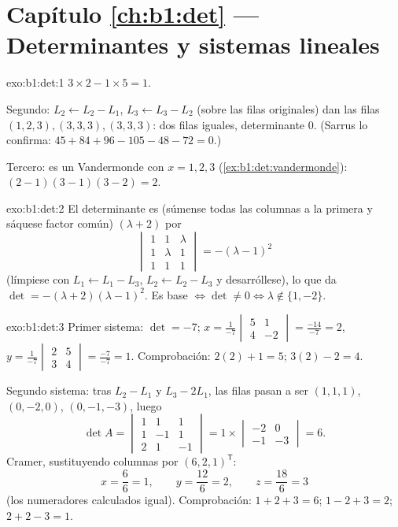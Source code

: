 \section*{Capítulo \ref{ch:b1:det} --- Determinantes y sistemas lineales}

\begin{solution}{exo:b1:det:1}
$3 \times 2 - 1 \times 5 = 1$.

Segundo: $L_2 \leftarrow L_2 - L_1$, $L_3 \leftarrow L_3 - L_2$
(sobre las filas originales) dan las filas $(1,2,3), (3,3,3),
(3,3,3)$: dos filas iguales, determinante $0$. (Sarrus lo confirma:
$45 + 84 + 96 - 105 - 48 - 72 = 0$.)

Tercero: es un Vandermonde con $x = 1, 2, 3$
(\cref{ex:b1:det:vandermonde}): $(2-1)(3-1)(3-2) = 2$.
\end{solution}

\begin{solution}{exo:b1:det:2}
El determinante es (súmense todas las columnas a la primera y
sáquese factor común) $(\lambda + 2)$ por
\[
\begin{vmatrix}
1 & 1 & \lambda\\ 1 & \lambda & 1\\ 1 & 1 & 1
\end{vmatrix}
= -(\lambda - 1)^2
\]
(límpiese con $L_1 \leftarrow L_1 - L_3$, $L_2 \leftarrow L_2 - L_3$
y desarróllese), lo que da $\det = -(\lambda+2)(\lambda-1)^2$. Es
base $\iff \det \neq 0 \iff \lambda \notin \{1, -2\}$.
\end{solution}

\begin{solution}{exo:b1:det:3}
Primer sistema: $\det = -7$;
$x = \frac{1}{-7}\begin{vmatrix} 5 & 1\\ 4 & -2\end{vmatrix}
= \frac{-14}{-7} = 2$,
$y = \frac{1}{-7}\begin{vmatrix} 2 & 5\\ 3 & 4\end{vmatrix}
= \frac{-7}{-7} = 1$. Comprobación: $2(2) + 1 = 5$; $3(2) - 2 = 4$.

Segundo sistema: tras $L_2 - L_1$ y $L_3 - 2L_1$, las filas pasan a
ser $(1,1,1)$, $(0,-2,0)$, $(0,-1,-3)$, luego
\[
\det A = \begin{vmatrix} 1&1&1\\ 1&-1&1\\ 2&1&-1\end{vmatrix}
= 1 \times \begin{vmatrix} -2 & 0\\ -1 & -3\end{vmatrix} = 6 .
\]
Cramer, sustituyendo columnas por $(6,2,1)^{\mathsf T}$:
\[
x = \frac{6}{6} = 1, \qquad
y = \frac{12}{6} = 2, \qquad
z = \frac{18}{6} = 3
\]
(los numeradores calculados igual). Comprobación: $1 + 2 + 3 = 6$;
$1 - 2 + 3 = 2$; $2 + 2 - 3 = 1$.
\end{solution}

